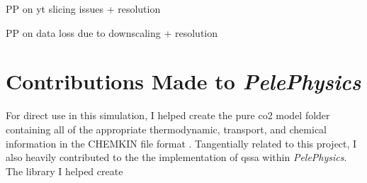 PP on yt slicing issues + resolution

PP on data loss due to downscaling + resolution


\section{Contributions Made to \textit{PelePhysics}}
For direct use in this simulation, I helped create the pure \gls{co2} model folder containing all of the appropriate thermodynamic, transport, and chemical information in the CHEMKIN file format \cite{}. Tangentially related to this project, I also heavily contributed to the the implementation of \gls{qssa} within \textit{PelePhysics}. The library I helped create 













